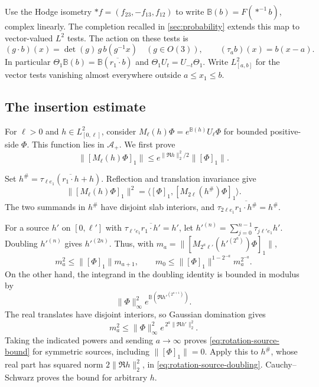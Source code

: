 Use the Hodge isometry
$*f=(f_{23},-f_{13},f_{12})$ to write
$\mathbb B(b)=F(*^{-1}b)$, complex linearly. The completion recalled
in \cref{sec:probability} extends this map to vector-valued $L^2$ tests.
The action on these tests is
\[
 (g\cdot b)(x)=\det(g)\,g\,b(g^{-1}x)
 \quad(g\in O(3)),\qquad
 (\tau_a b)(x)=b(x-a).
\]
In particular
$\Theta_1\mathbb B(b)=\mathbb B(\overline{r_1\cdot b})$
and $\Theta_1U_t=U_{-t}\Theta_1$.
Write $L^2_{[a,b]}$ for the vector tests vanishing almost everywhere
outside $a\le x_1\le b$.

\subsection{The insertion estimate}\label{subsec:rotation-insertion}

For $\ell>0$ and $h\in L^2_{[0,\ell]}$, consider
$M_\ell(h)\Phi=e^{\mathbb B(h)}U_\ell\Phi$ for bounded
positive-side $\Phi$. This function lies in $\mathcal A_+$.
We first prove
\begin{equation}\label{eq:rotation-source-bound}
 \|[M_\ell(h)\Phi]_1\|
       \le e^{\|\Re h\|_2^2/2}\|[\Phi]_1\|.
\end{equation}

Set $h^\#=\tau_{\ell e_1}(\overline{r_1\cdot h}+h)$.
Reflection and translation invariance give
\begin{equation}\label{eq:rotation-source-doubling}
 \|[M_\ell(h)\Phi]_1\|^2
   =\langle[\Phi]_1,[M_{2\ell}(h^\#)\Phi]_1\rangle.
\end{equation}
The two summands in $h^\#$ have disjoint slab interiors, and
$\tau_{2\ell e_1}\overline{r_1\cdot h^\#}=h^\#$.

For a source $h'$ on $[0,\ell']$ with
$\tau_{\ell'e_1}\overline{r_1\cdot h'}=h'$, let
$h'^{(n)}=\sum_{j=0}^{n-1}\tau_{j\ell'e_1}h'$.
Doubling $h'^{(n)}$ gives $h'^{(2n)}$. Thus, with
$m_a=\|[M_{2^a\ell'}(h'^{(2^a)})\Phi]_1\|$,
\[
 m_a^2\le\|[\Phi]_1\|m_{a+1},\qquad
 m_0\le\|[\Phi]_1\|^{1-2^{-a}}m_a^{2^{-a}}.
\]
On the other hand, the integrand in the doubling identity is bounded
in modulus by
\[
 \|\Phi\|_\infty^2e^{\mathbb B(\Re h'^{(2^{a+1})})}.
\]
The real translates have disjoint interiors, so Gaussian domination
gives
\[
 m_a^2\le\|\Phi\|_\infty^2
       e^{\,2^a\|\Re h'\|_2^2}.
\]
Taking the indicated powers and sending $a\to\infty$ proves
\eqref{eq:rotation-source-bound} for symmetric sources, including
$\|[\Phi]_1\|=0$. Apply this to $h^\#$, whose real part has squared
norm $2\|\Re h\|_2^2$, in
\eqref{eq:rotation-source-doubling}. Cauchy--Schwarz proves the
bound for arbitrary $h$.

